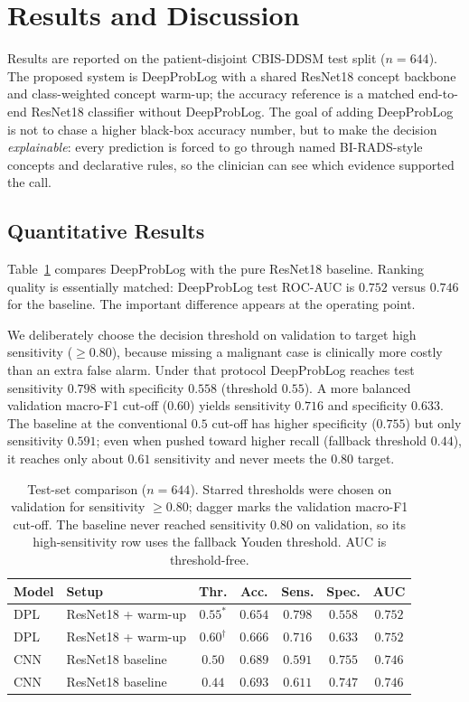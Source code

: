 \section{Results and Discussion}
\label{sec:results}

Results are reported on the patient-disjoint CBIS-DDSM test split ($n=644$). The proposed system is DeepProbLog with a shared ResNet18 concept backbone and class-weighted concept warm-up; the accuracy reference is a matched end-to-end ResNet18 classifier without DeepProbLog. The goal of adding DeepProbLog is not to chase a higher black-box accuracy number, but to make the decision \emph{explainable}: every prediction is forced to go through named BI-RADS-style concepts and declarative rules, so the clinician can see which evidence supported the call.

\subsection{Quantitative Results}
\label{sec:quant}

Table~\ref{tab:comparison} compares DeepProbLog with the pure ResNet18 baseline. Ranking quality is essentially matched: DeepProbLog test ROC-AUC is $0.752$ versus $0.746$ for the baseline. The important difference appears at the operating point.

We deliberately choose the decision threshold on validation to target high sensitivity ($\geq 0.80$), because missing a malignant case is clinically more costly than an extra false alarm. Under that protocol DeepProbLog reaches test sensitivity $0.798$ with specificity $0.558$ (threshold $0.55$). A more balanced validation macro-F1 cut-off ($0.60$) yields sensitivity $0.716$ and specificity $0.633$. The baseline at the conventional $0.5$ cut-off has higher specificity ($0.755$) but only sensitivity $0.591$; even when pushed toward higher recall (fallback threshold $0.44$), it reaches only about $0.61$ sensitivity and never meets the $0.80$ target.

\begin{table}[!t]
\caption{Test-set comparison ($n=644$). Starred thresholds were chosen on validation for sensitivity $\geq 0.80$; dagger marks the validation macro-F1 cut-off. The baseline never reached sensitivity $0.80$ on validation, so its high-sensitivity row uses the fallback Youden threshold. AUC is threshold-free.}
\label{tab:comparison}
\centering
\small
\begin{tabular}{@{}llccccc@{}}
\toprule
Model & Setup & Thr. & Acc. & Sens. & Spec. & AUC \\
\midrule
DPL & ResNet18 + warm-up & $0.55^*$ & $0.654$ & $0.798$ & $0.558$ & $0.752$ \\
DPL & ResNet18 + warm-up & $0.60^\dagger$ & $0.666$ & $0.716$ & $0.633$ & $0.752$ \\
CNN & ResNet18 baseline & $0.50$ & $0.689$ & $0.591$ & $0.755$ & $0.746$ \\
CNN & ResNet18 baseline & $0.44$ & $0.693$ & $0.611$ & $0.747$ & $0.746$ \\
\bottomrule
\end{tabular}
\end{table}

